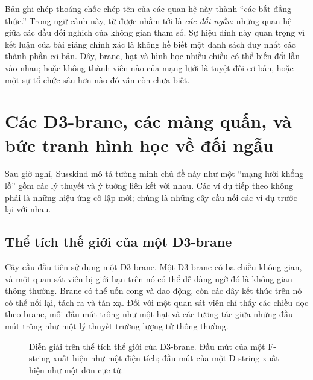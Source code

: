 Bản ghi chép thoáng chốc chép tên của các quan hệ này thành ``các bất đẳng thức.'' Trong ngữ cảnh này, từ được nhắm tới là \emph{các đối ngẫu}: những quan hệ giữa các đầu đối nghịch của không gian tham số. Sự hiệu đính này quan trọng vì kết luận của bài giảng chính xác là không hề biết một danh sách duy nhất các thành phần cơ bản. Dây, brane, hạt và hình học nhiều chiều có thể biến đổi lẫn vào nhau; hoặc không thành viên nào của mạng lưới là tuyệt đối cơ bản, hoặc một sự tổ chức sâu hơn nào đó vẫn còn chưa biết.

\section{Các D3-brane, các màng quấn, và bức tranh hình học về đối ngẫu}

Sau giờ nghỉ, Susskind mô tả tường minh chủ đề này như một ``mạng lưới khổng lồ'' gồm các lý thuyết và ý tưởng liên kết với nhau. Các ví dụ tiếp theo không phải là những hiệu ứng cô lập mới; chúng là những cây cầu nối các ví dụ trước lại với nhau.

\subsection{Thể tích thế giới của một D3-brane}

Cây cầu đầu tiên sử dụng một D3-brane. Một D3-brane có ba chiều không gian, và một quan sát viên bị giới hạn trên nó có thể dễ dàng ngỡ đó là không gian thông thường. Brane có thể uốn cong và dao động, còn các dây kết thúc trên nó có thể nối lại, tách ra và tán xạ. Đối với một quan sát viên chỉ thấy các chiều dọc theo brane, mỗi đầu mút trông như một hạt và các tương tác giữa những đầu mút trông như một lý thuyết trường lượng tử thông thường.

\begin{figure}[htbp]
\centering
{}%
\caption{Diễn giải trên thể tích thế giới của D3-brane. Đầu mút của một F-string xuất hiện như một điện tích; đầu mút của một D-string xuất hiện như một đơn cực từ.}
\end{figure}

